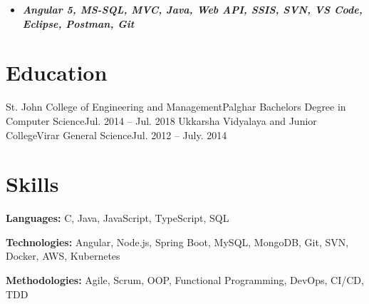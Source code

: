 \documentclass{resume}
\begin{document}
    
            \begin{itemize}[leftmargin=-0.15in, label={}]
                \item\textit{\textbf{\fontsize{10}{12}\selectfont 
                    Angular 5, MS-SQL, MVC, Java, Web API, SSIS, SVN, VS Code, Eclipse, Postman, Git
                }}
            \end{itemize}
    \resumeItemListEnd
    
    \resumeSubHeadingListEnd

\section{Education}
  \resumeSubHeadingListStart
    \resumeSubheading
      {St. John College of Engineering and Management}{Palghar}
      {Bachelors Degree in Computer Science}{Jul. 2014 -- Jul. 2018}
    \resumeSubheading
      {Ukkarsha Vidyalaya and Junior College}{Virar}
      {General Science}{Jul. 2012 -- July. 2014}
  \resumeSubHeadingListEnd




\section{Skills}
  \resumeSubHeadingListStart
    \small{\item{
        
        \textbf{Languages:}{ C, Java, JavaScript, TypeScript, SQL} \\ \vspace{3pt}
        
        \textbf{Technologies:}{ Angular, Node.js, Spring Boot, MySQL, MongoDB, Git, SVN, Docker, AWS, Kubernetes} \\ \vspace{3pt}
        
        \textbf{Methodologies:}{ Agile, Scrum, OOP, Functional Programming, DevOps, CI/CD, TDD} \\ \vspace{3pt}
        
    }}
  \resumeSubHeadingListEnd


\end{document}
